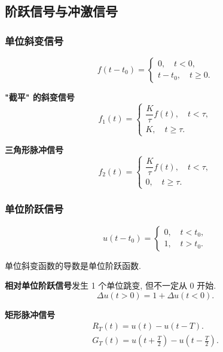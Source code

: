 \subsection{阶跃信号与冲激信号}
\subsubsection{单位斜变信号}

\rmg
\begin{equation}
    f(t-t_0)=\begin{cases}
        0,\quad t<0, \\
        t-t_0,\quad t\geq 0.
    \end{cases}
\end{equation}

\textbf{"截平" 的斜变信号}
\begin{equation}
    f_1(t)=\begin{cases}
        \dfrac{K}{\tau}f(t),\quad t<\tau, \\
        K,\quad t\geq\tau.
    \end{cases}
\end{equation}

\textbf{三角形脉冲信号}
\begin{equation}
    f_2(t)=\begin{cases}
        \dfrac{K}{\tau}f(t),\quad t<\tau, \\
        0,\quad t\geq\tau.
    \end{cases}
\end{equation}

\subsubsection{单位阶跃信号}

\rmg
\begin{equation}
    u(t-t_0)=\begin{cases}
        0,\quad t<t_0, \\
        1,\quad t>t_0.
    \end{cases}
\end{equation}

单位斜变函数的导数是单位阶跃函数.

\textbf{相对单位阶跃信号}\quad 发生 1 个单位跳变, 但不一定从 0 开始.
\begin{equation}
    \Delta u(t>0)=1+\Delta u(t<0).
\end{equation}

\textbf{矩形脉冲信号}
\begin{gather}
    R_T(t)=u(t)-u(t-T). \\
    G_T(t)=u\left(t+\frac{T}{2}\right)-u\left(t-\frac{T}{2}\right).
\end{gather}

